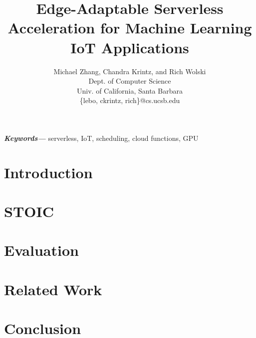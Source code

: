 \documentclass[12pt, onecolumn]{article}
\title{Edge-Adaptable Serverless Acceleration for Machine Learning IoT Applications}
\author{Michael Zhang, Chandra Krintz, and  Rich Wolski \\
        \small Dept. of Computer Science \\
        \small Univ. of California, Santa Barbara \\
        \small \{lebo, ckrintz, rich\}@cs.ucsb.edu \\
}
\date{} %
\providecommand{\keywords}[1]
{
  \small	
  \textbf{\textit{Keywords---}} #1
}
\begin{document}
\maketitle

\begin{abstract}
\label{sec:abstract}

\end{abstract}

\keywords{serverless, IoT, scheduling, cloud functions, GPU}



\section{Introduction}
\label{sec:intro}


\section{STOIC}
\label{sec:stoic}


\section{Evaluation}
\label{sec:results}


\section{Related Work}
\label{sec:related}



\section{Conclusion}
\label{sec:conc}








\end{document}
